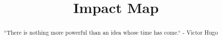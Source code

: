 \documentclass{ximera}
\title{Impact Map}
\begin{document}
\begin{abstract}
``There is nothing more powerful than an idea whose time has come.`` - Victor Hugo
\end{abstract}
\maketitle
\end{document}
